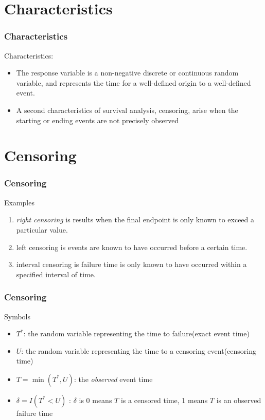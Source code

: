 \documentclass{beamer}
\newcommand{\empr}[1]{{\emph{\color{red}#1}}}
\begin{document}
\section{Characteristics}
\begin{frame}
\frametitle{Characteristics}
Characteristics:
\begin{itemize}
	\item The response variable is a {\color{red} non-negative} discrete or continuous random variable, and represents the time for a well-defined origin to a well-defined event.
	\item A second characteristics of survival analysis, {\color{red} censoring, arise when the starting or ending events are not precisely observed}
\end{itemize}
\end{frame}


\section{Censoring}
\begin{frame}[fragile]
\frametitle{Censoring}
Examples
\begin{enumerate}	
\item \empr{right censoring} is results when the final endpoint is only known to exceed a particular value.
\item left censoring is events are known to have occurred before a certain time.
\item interval censoring is failure time is only known to have occurred within a specified interval of time.
\end{enumerate}
\end{frame}

\pagebreak

\begin{frame}[fragile]
\frametitle{Censoring}
Symbols
\begin{itemize}
\item $T^*$: the random variable representing the time to failure(exact event time)
\item $U$: the random variable representing the time to a censoring event(censoring time)
\item $T = \min(T^*, U)$: the \empr{observed} event time
\item $\delta = I(T^* <  U)$ : $\delta$ is 0 means $T$ is a censored time, 1 means  $T$ is an observed failure time

\end{itemize}
\end{frame}
\end{document}
